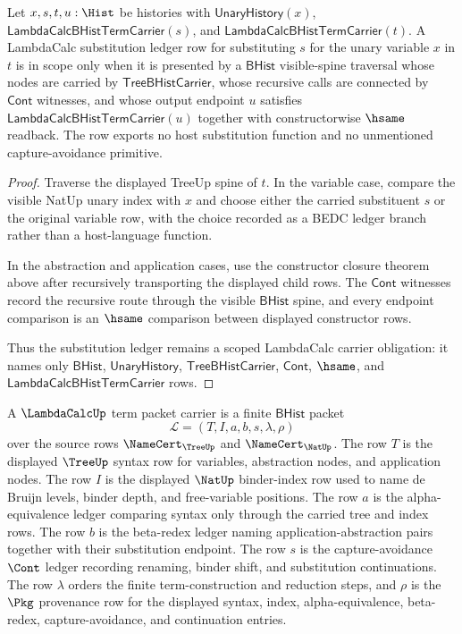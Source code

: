 \begin{theorem}
\label{thm:lambdacalc-substitution-ledger-scope}
Let $x,s,t,u:\Hist$ be histories with $\mathsf{UnaryHistory}(x)$,
$\mathsf{LambdaCalcBHistTermCarrier}(s)$, and
$\mathsf{LambdaCalcBHistTermCarrier}(t)$. A LambdaCalc substitution ledger row
for substituting $s$ for the unary variable $x$ in $t$ is in scope only when it
is presented by a $\mathsf{BHist}$ visible-spine traversal whose nodes are carried by
$\mathsf{TreeBHistCarrier}$, whose recursive calls are connected by
$\mathsf{Cont}$ witnesses, and whose output endpoint $u$ satisfies
$\mathsf{LambdaCalcBHistTermCarrier}(u)$ together with constructorwise
$\hsame$ readback. The row exports no host substitution function and no
unmentioned capture-avoidance primitive.
\end{theorem}
\begin{proof}
Traverse the displayed TreeUp spine of $t$. In the variable case, compare the
visible NatUp unary index with $x$ and choose either the carried substituent
$s$ or the original variable row, with the choice recorded as a BEDC ledger
branch rather than a host-language function.

In the abstraction and application cases, use the constructor closure theorem
above after recursively transporting the displayed child rows. The
$\mathsf{Cont}$ witnesses record the recursive route through the visible
$\mathsf{BHist}$ spine, and every endpoint comparison is an $\hsame$ comparison
between displayed constructor rows.

Thus the substitution ledger remains a scoped LambdaCalc carrier obligation:
it names only $\mathsf{BHist}$, $\mathsf{UnaryHistory}$, $\mathsf{TreeBHistCarrier}$,
$\mathsf{Cont}$, $\hsame$, and $\mathsf{LambdaCalcBHistTermCarrier}$ rows.
\end{proof}

\begin{definition}
\label{def:lambdacalc-term-packet-carrier}
A $\LambdaCalcUp$ term packet carrier is a finite $\mathsf{BHist}$ packet
$$
\mathcal L=(T,I,a,b,s,\lambda,\rho)
$$
over the source rows $\NameCert_{\TreeUp}$ and $\NameCert_{\NatUp}$. The row
$T$ is the displayed $\TreeUp$ syntax row for variables, abstraction nodes,
and application nodes. The row $I$ is the displayed $\NatUp$ binder-index row
used to name de Bruijn levels, binder depth, and free-variable positions.
The row $a$ is the alpha-equivalence ledger comparing syntax only through the
carried tree and index rows. The row $b$ is the beta-redex ledger naming
application-abstraction pairs together with their substitution endpoint. The
row $s$ is the capture-avoidance $\Cont$ ledger recording renaming, binder
shift, and substitution continuations. The row $\lambda$ orders the finite
term-construction and reduction steps, and $\rho$ is the $\Pkg$ provenance row
for the displayed syntax, index, alpha-equivalence, beta-redex,
capture-avoidance, and continuation entries.
\end{definition}

